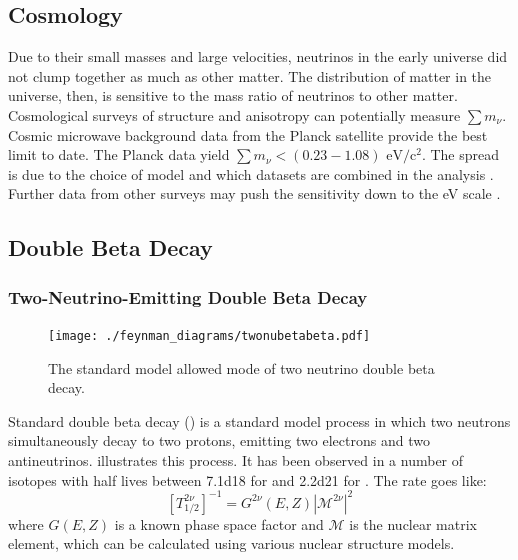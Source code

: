 \documentclass[herrin-thesis.tex]{subfiles}
\begin{document}
\subsection{Cosmology}
Due to their small masses and large velocities, neutrinos in the early universe did not clump together as much as other matter. The distribution of matter in the universe, then, is sensitive to the mass ratio of neutrinos to other matter. Cosmological surveys of structure and anisotropy can potentially measure \(\sum m_{\nu}\). Cosmic microwave background data from the Planck satellite provide the best limit to date. The Planck data yield \(\sum m_{\nu} < (0.23 - 1.08) \text{ eV}/\text{c}^2\). The spread is due to the choice of model and which datasets are combined in the analysis \cite{Ade:2013kl}. Further data from other surveys may push the sensitivity down to the \si{\eV} scale \cite{Abazajian:2011dt}.

\subsection{Double Beta Decay}
\label{sec:nu_doublebetadecay}

\subsubsection{Two-Neutrino-Emitting Double Beta Decay}

\begin{figure}[htp]
	\centering
	\texttt{[image: ./feynman\_diagrams/twonubetabeta.pdf]}
	\caption[\(2\nu\beta\beta\) decay]{The standard model allowed mode of two neutrino double beta decay.}
	\label{fig:nu_diagram_2nubb}
\end{figure}

Standard double beta decay (\twonu{}) is a standard model process in which two neutrons simultaneously decay to two protons, emitting two electrons and two antineutrinos.  illustrates this process. It has been observed in a number of isotopes with half lives between \SI{7.1d18}{\year} for  \cite{Arnold:2005hc} and \SI{2.2d21}{\year} for  \cite{Auger:2012ar}. The rate goes like:
\begin{equation}
\left [ T^{2\nu}_{1/2} \right ]^{-1} = G^{2\nu}\left(E, Z\right)\left| \mathcal{M}^{2\nu}\right |^2
\label{eq:nu_twonu_rate}
\end{equation}
where \(G(E,Z)\) is a known phase space factor and \(\mathcal{M}\) is the nuclear matrix element, which can be calculated using various nuclear structure models.
\end{document}
